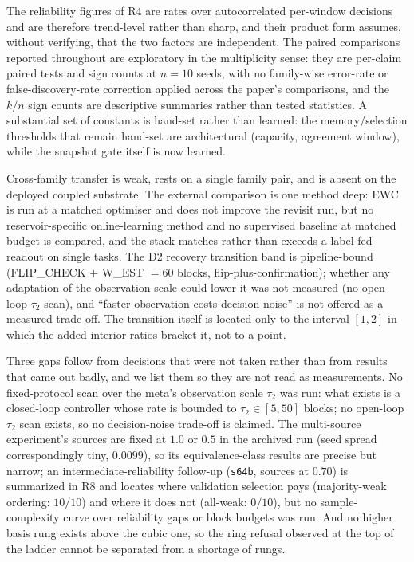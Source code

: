 \documentclass[preprint,12pt]{elsarticle}
\begin{document}
The
reliability figures of R4 are rates over autocorrelated per-window decisions
and are therefore trend-level rather than sharp, and their product form
assumes, without verifying, that the two factors are independent. The
paired comparisons reported throughout are exploratory in the
multiplicity sense: they are per-claim paired tests and sign counts at
$n=10$ seeds, with no family-wise error-rate or false-discovery-rate
correction applied across the paper's comparisons, and the $k/n$ sign counts
are descriptive summaries rather than tested statistics. A
substantial set of constants is hand-set rather than learned: the
memory/selection thresholds that remain hand-set are architectural
(capacity, agreement window), while the snapshot gate itself is now learned.

Cross-family transfer is weak, rests on a single family pair, and is absent on
the deployed coupled substrate. The external comparison is one method deep:
EWC \cite{kirkpatrick2017} is run at a matched optimiser and does not improve
the revisit run, but no reservoir-specific online-learning method and no
supervised baseline at matched budget is compared,
and the stack matches rather than exceeds a label-fed readout on single
tasks. The D2 recovery transition band is
pipeline-bound (FLIP\_CHECK $+$ W\_EST $=60$ blocks, flip-plus-confirmation);
whether any
adaptation of the observation scale could lower it was not measured
(no open-loop $\tau_2$ scan), and ``faster observation costs decision
noise'' is not offered as a measured trade-off. The transition itself is
located only to the interval $[1,2]$ in which the added interior ratios
bracket it, not to a point.

Three gaps follow from decisions that were not
taken rather than from results that came out badly, and we list them so they
are not read as measurements. No fixed-protocol scan over the meta's
observation scale $\tau_2$ was run: what exists is a closed-loop controller
whose rate is bounded to $\tau_2\in[5,50]$ blocks; no open-loop $\tau_2$
scan exists, so no decision-noise trade-off is claimed. The
multi-source experiment's sources are fixed at $1.0$ or $0.5$ in the
archived run (seed spread correspondingly tiny, $0.0099$), so its
equivalence-class results are precise but narrow; an
intermediate-reliability follow-up (\texttt{s64b}, sources at $0.70$)
is summarized in R8 and locates where validation selection pays
(majority-weak ordering: $10/10$) and where it does not (all-weak:
$0/10$), but no sample-complexity curve over reliability gaps or block
budgets was run. And no
higher basis rung exists above the cubic one, so the ring refusal observed at
the top of the ladder cannot be separated from a shortage of rungs.
\end{document}
